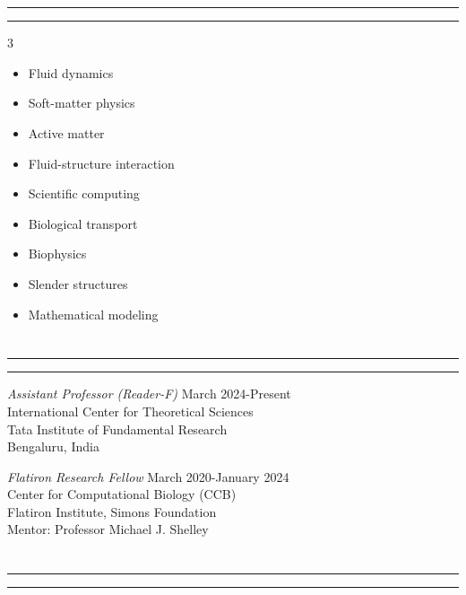 \documentclass[10pt]{res} %
\begin{document}
\begin{resume}
\vspace*{-2mm}
\section{}
\hrule
\hrule
\vspace*{4mm} %
\begin{multicols}{3}
	\begin{itemize}
		\item[] Fluid dynamics
		\item[] Soft-matter physics
		\item[] Active matter
		\item[] Fluid-structure interaction
		\item[] Scientific computing
		\item[] Biological transport
		\item[] Biophysics
		\item[] Slender structures
		\item[] Mathematical modeling
	\end{itemize}
\end{multicols}

\vspace*{-4mm}
\section{}
\hrule
\hrule

\vspace*{4mm} %
{\sl Assistant Professor (Reader-F)} \hfill March 2024-Present \\
International Center for Theoretical Sciences \\ 
Tata Institute of Fundamental Research \\
Bengaluru, India 

\vspace*{4mm} %
{\sl Flatiron Research Fellow} \hfill March 2020-January 2024 \\
Center for Computational Biology (CCB)  \\
Flatiron Institute, Simons Foundation  \\
Mentor: Professor Michael J. Shelley 


 
\vspace*{-2mm}
\section{}
\hrule
\hrule


\end{resume}
\end{document}
